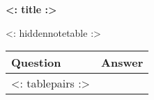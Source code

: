 \usepackage{longtable}


\begin{center}
  \textbf{<: title :>}

  \medskip

  <: hiddennotetable :>

  \bigskip

  \begin{longtable}{|p{}|p{}|}
    \hline
    \textbf{Question}&\textbf{Answer}\\\hline\endhead
    <: tablepairs :>
  \end{longtable}
\end{center}



